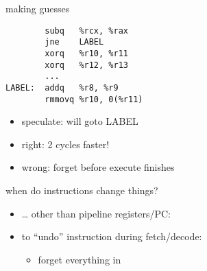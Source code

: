 
\begin{frame}[fragile,label=makingGuesses]{making guesses}
\begin{lstlisting}
        subq   %rcx, %rax
        jne    LABEL
        xorq   %r10, %r11
        xorq   %r12, %r13
        ...
LABEL:  addq   %r8, %r9
        rmmovq %r10, 0(%r11)
\end{lstlisting}
\begin{itemize}
    \item speculate:  will goto LABEL
    \item right: 2 cycles faster!
    \item wrong: forget before execute finishes
\end{itemize}
\end{frame}

\begin{frame}{when do instructions change things?}
\begin{itemize}
\item \ldots{} other than pipeline registers/PC: \\
\item<2-> to ``undo'' instruction during fetch/decode:
    \begin{itemize}
    \item forget everything in 
    \end{itemize}
\end{itemize}
\end{frame}

